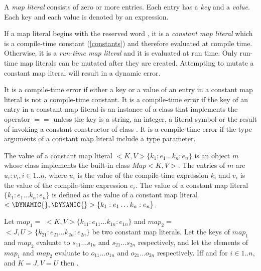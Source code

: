 \documentclass{article}
\begin{document}
\LMHash{}
A {\em map literal} consists of zero or more entries.
Each entry has a {\em key} and a {\em value}.
Each key and each value is denoted by an expression.

\LMHash{}
If a map literal begins with the reserved word \CONST{}, it is a {\em constant map literal} which is a compile-time constant (\ref{constants}) and therefore evaluated at compile time.
Otherwise, it is a {\em run-time map literal} and it is evaluated at run time.
Only run-time map literals can be mutated after they are created.
Attempting to mutate a constant map literal will result in a dynamic error.

\LMHash{}
It is a compile-time error if either a key or a value of an entry in a constant map literal is not a compile-time constant.
It is a compile-time error if the key of an entry in a constant map literal is an instance of a class that implements the operator $==$ unless the key is a
string, an integer, a literal symbol or the result of invoking a constant constructor of class .
It is a compile-time error if the type arguments of a constant map literal include a type parameter.

\LMHash{}
The value of a constant map literal \CONST{}$ <K, V>\{k_1:e_1\ldots k_n :e_n\}$ is an object $m$ whose class implements the built-in class $Map<K, V>$.
The entries of $m$ are $u_i:v_i, i \in 1 .. n$, where $u_i$ is the value of the compile-time expression $k_i$ and $v_i$ is the value of the compile-time expression $e_i$.
The value of a constant map literal \CONST{} $\{k_1:e_1\ldots k_n :e_n\}$ is defined as the value of a constant map literal \CONST{} $<\DYNAMIC{}, \DYNAMIC{}>\{k_1:e_1\ldots k_n :e_n\}$.

\LMHash{}
Let $map_1 =$ \CONST{}$ <K, V>\{k_{11}:e_{11} \ldots k_{1n} :e_{1n}\}$ and $map_2 =$ \CONST{}$ <J, U>\{k_{21}:e_{21} \ldots k_{2n} :e_{2n}\}$ be two constant map literals.
Let the keys of $map_1$ and $map_2$ evaluate to $s_{11} \ldots s_{1n}$ and $s_{21} \ldots s_{2n}$ respectively, and let the elements of $map_1$ and $map_2$ evaluate to $o_{11} \ldots o_{1n}$ and $o_{21} \ldots o_{2n}$ respectively.
If{}f  and  for $i \in 1 .. n$, and $K = J, V = U$ then .

\end{document}
